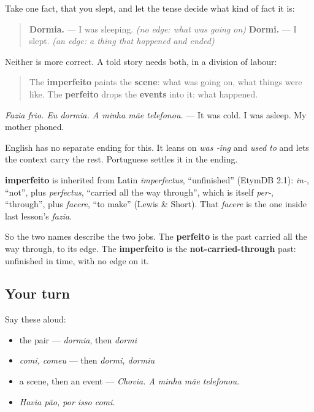 \begin{grammarlens}[title={Grammar Lens: the scene and the events}]
Take one fact, that you slept, and let the tense decide what kind of fact it is:

\begin{quote}
\textbf{Dormia.} — I was sleeping. \emph{(no edge: what was going on)} \textbf{Dormi.} — I slept. \emph{(an edge: a thing that happened and ended)}
\end{quote}

Neither is more correct. A told story needs both, in a division of labour:

\begin{quote}
The \textbf{imperfeito} paints the \textbf{scene}: what was going on, what things were like. The \textbf{perfeito} drops the \textbf{events} into it: what happened.
\end{quote}

\emph{Fazia frio. Eu dormia. A minha mãe telefonou.} — It was cold. I was asleep. My mother phoned.

English has no separate ending for this. It leans on \emph{was ‑ing} and \emph{used to} and lets the context carry the rest. Portuguese settles it in the ending.
\end{grammarlens}

\begin{cousinweb}
\textbf{imperfeito} is inherited from Latin \emph{imperfectus}, \textquotedblleft{}unfinished\textquotedblright{} (EtymDB 2.1): \emph{in-}, \textquotedblleft{}not\textquotedblright{}, plus \emph{perfectus}, \textquotedblleft{}carried all the way through\textquotedblright{}, which is itself \emph{per-}, \textquotedblleft{}through\textquotedblright{}, plus \emph{facere}, \textquotedblleft{}to make\textquotedblright{} (Lewis \& Short). That \emph{facere} is the one inside last lesson's \emph{fazia}.

So the two names describe the two jobs. The \textbf{perfeito} is the past carried all the way through, to its edge. The \textbf{imperfeito} is the \textbf{not-carried-through} past: unfinished in time, with no edge on it.
\end{cousinweb}

\subsection*{Your turn}
Say these aloud:

\begin{itemize}
\raggedright
  \item the pair — \emph{dormia}, then \emph{dormi}
  \item \emph{comi, comeu} — then \emph{dormi, dormiu}
  \item a scene, then an event — \emph{Chovia. A minha mãe telefonou.}
  \item \emph{Havia pão, por isso comi.}
\end{itemize}

